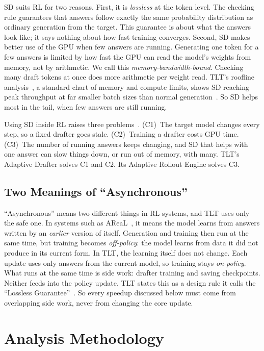 \documentclass[conference]{IEEEtran}
\begin{document}
SD suits RL for two reasons. First, it is \emph{lossless} at the token level. The checking rule guarantees that answers follow exactly the same probability distribution as ordinary generation from the target. This guarantee is about what the answers look like; it says nothing about how fast training converges. Second, SD makes better use of the GPU when few answers are running. Generating one token for a few answers is limited by how fast the GPU can read the model's weights from memory, not by arithmetic. We call this \emph{memory-bandwidth-bound}. Checking many draft tokens at once does more arithmetic per weight read. TLT's roofline analysis~\cite{williams2009roofline}, a standard chart of memory and compute limits, shows SD reaching peak throughput at far smaller batch sizes than normal generation~\cite[Sec.~2.2, Fig.~5c]{hu2026tlt}. So SD helps most in the tail, when few answers are still running.

Using SD inside RL raises three problems~\cite[Sec.~2.2]{hu2026tlt}. (C1)~The target model changes every step, so a fixed drafter goes stale. (C2)~Training a drafter costs GPU time. (C3)~The number of running answers keeps changing, and SD that helps with one answer can slow things down, or run out of memory, with many. TLT's Adaptive Drafter solves C1 and C2. Its Adaptive Rollout Engine solves C3.

\subsection{Two Meanings of ``Asynchronous''}
\label{sec:twoasync}
``Asynchronous'' means two different things in RL systems, and TLT uses only the safe one. In systems such as AReaL~\cite{fu2025areal}, it means the model learns from answers written by an \emph{earlier} version of itself. Generation and training then run at the same time, but training becomes \emph{off-policy}: the model learns from data it did not produce in its current form. In TLT, the learning itself does not change. Each update uses only answers from the current model, so training stays \emph{on-policy}. What runs at the same time is side work: drafter training and saving checkpoints. Neither feeds into the policy update. TLT states this as a design rule it calls the ``Lossless Guarantee''~\cite[Sec.~3]{hu2026tlt}. So every speedup discussed below must come from overlapping side work, never from changing the core update.

\section{Analysis Methodology}
\label{sec:method}
\end{document}

